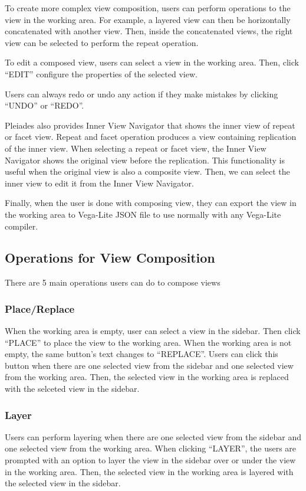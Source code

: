 \documentclass[journal]{vgtc}                %
\begin{document}
To create more complex view composition, users can perform operations to the view
in the working area. For example, a layered view can then be horizontally concatenated
with another view. Then, inside the concatenated views, the right view can be selected
to perform the repeat operation.

To edit a composed view, users can select a view in the working area. Then, click
``EDIT'' configure the properties of the selected view.

Users can always redo or undo any action if they make mistakes by clicking ``UNDO''
or ``REDO''.

Pleiades also provides Inner View Navigator that shows the inner view of repeat
or facet view. Repeat and facet operation produces a view containing replication
of the inner view. When selecting a repeat or facet view, the Inner View Navigator
shows the original view before the replication. This functionality is useful when
the original view is also a composite view. Then, we can select the inner view to
edit it from the Inner View Navigator.

Finally, when the user is done with composing view, they can export the view in
the working area to Vega-Lite JSON file to use normally with any Vega-Lite compiler.


\subsection{Operations for View Composition}
There are 5 main operations users can do to compose views

\subsubsection{Place/Replace}
When the working area is empty, user can select a view in the sidebar. Then click
“PLACE” to place the view to the working area. When the working area is not empty,
the same button's text changes to ``REPLACE''. Users can click this button when
there are one selected view from the sidebar and one selected view from the working
area. Then, the selected view in the working area is replaced with the selceted
view in the sidebar.

\subsubsection{Layer}
Users can perform layering when there are one selected view from the sidebar and
one selected view from the working area. When clicking “LAYER”, the users are
prompted with an option to layer the view in the sidebar over or under the view
in the working area. Then, the selected view in the working area is layered with
the selected view in the sidebar.
\end{document}
